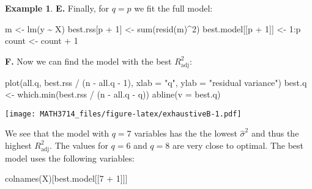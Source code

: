 \documentclass[
  a4paper,
]{article}
\newenvironment{Shaded}{\begin{snugshade}}{\end{snugshade}}
\newcommand{\AttributeTok}[1]{\textcolor[rgb]{0.77,0.63,0.00}{#1}}
\newcommand{\DecValTok}[1]{\textcolor[rgb]{0.00,0.00,0.81}{#1}}
\newcommand{\FunctionTok}[1]{\textcolor[rgb]{0.00,0.00,0.00}{#1}}
\newcommand{\NormalTok}[1]{#1}
\newcommand{\OtherTok}[1]{\textcolor[rgb]{0.56,0.35,0.01}{#1}}
\newcommand{\SpecialCharTok}[1]{\textcolor[rgb]{0.00,0.00,0.00}{#1}}
\newcommand{\StringTok}[1]{\textcolor[rgb]{0.31,0.60,0.02}{#1}}
\theoremstyle{definition}
\theoremstyle{definition}
\newtheorem{example}{Example}[section]
\theoremstyle{definition}
\theoremstyle{definition}
\theoremstyle{remark}
\begin{document}
\begin{example}
\textbf{E.} Finally, for \(q = p\) we fit the full model:

\begin{Shaded}
\begin{Highlighting}[]
\NormalTok{m }\OtherTok{\textless{}{-}} \FunctionTok{lm}\NormalTok{(y }\SpecialCharTok{\textasciitilde{}}\NormalTok{ X)}
\NormalTok{best.rss[p }\SpecialCharTok{+} \DecValTok{1}\NormalTok{] }\OtherTok{\textless{}{-}} \FunctionTok{sum}\NormalTok{(}\FunctionTok{resid}\NormalTok{(m)}\SpecialCharTok{\^{}}\DecValTok{2}\NormalTok{)}
\NormalTok{best.model[[p }\SpecialCharTok{+} \DecValTok{1}\NormalTok{]] }\OtherTok{\textless{}{-}} \DecValTok{1}\SpecialCharTok{:}\NormalTok{p}
\NormalTok{count }\OtherTok{\textless{}{-}}\NormalTok{ count }\SpecialCharTok{+} \DecValTok{1}
\end{Highlighting}
\end{Shaded}

\textbf{F.} Now we can find the model with the best \(R^2_\mathrm{adj}\):

\begin{Shaded}
\begin{Highlighting}[]
\FunctionTok{plot}\NormalTok{(all.q, best.rss }\SpecialCharTok{/}\NormalTok{ (n }\SpecialCharTok{{-}}\NormalTok{ all.q }\SpecialCharTok{{-}} \DecValTok{1}\NormalTok{),}
     \AttributeTok{xlab =} \StringTok{"q"}\NormalTok{, }\AttributeTok{ylab =} \StringTok{"residual variance"}\NormalTok{)}
\NormalTok{best.q }\OtherTok{\textless{}{-}} \FunctionTok{which.min}\NormalTok{(best.rss }\SpecialCharTok{/}\NormalTok{ (n }\SpecialCharTok{{-}}\NormalTok{ all.q }\SpecialCharTok{{-}}\NormalTok{ q))}
\FunctionTok{abline}\NormalTok{(}\AttributeTok{v =}\NormalTok{ best.q)}
\end{Highlighting}
\end{Shaded}

\texttt{[image: MATH3714\_files/figure-latex/exhaustiveB-1.pdf]}

We see that the model with \(q = 7\) variables has the the
lowest \(\hat\sigma^2\) and thus the highest \(R^2_\mathrm{adj}\).
The values for \(q = 6\) and \(q = 8\) are very close to
optimal. The best model uses the following variables:

\begin{Shaded}
\begin{Highlighting}[]
\FunctionTok{colnames}\NormalTok{(X)[best.model[[}\DecValTok{7} \SpecialCharTok{+} \DecValTok{1}\NormalTok{]]]}
\end{Highlighting}
\end{Shaded}


\end{example}
\end{document}
